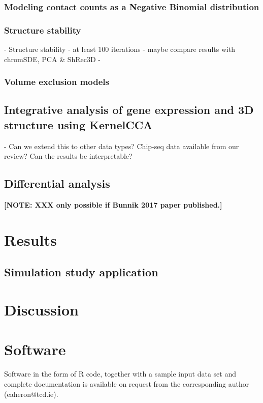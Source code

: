 \documentclass[oupdraft]{bio}
\newcommand{\note}[1]{\textbf{[NOTE: #1]}}
\begin{document}
\subsubsection{Modeling contact counts as a Negative Binomial distribution}


\subsubsection{Structure stability}
- Structure stability
- at least 100 iterations
- maybe compare results with chromSDE, PCA \& ShRec3D 
- 
\subsubsection{Volume exclusion models}

\subsection{Integrative analysis of gene expression and 3D structure using KernelCCA}

- Can we extend this to other data types? Chip-seq data available from our
review? Can the results be interpretable?

\subsection{Differential analysis}
\note{XXX only possible if Bunnik 2017 paper published.}

\section{Results}
\label{sec3}

\subsection{Simulation study application}

\section{Discussion}
\label{sec4}



\section{Software}
\label{sec5}

Software in the form of R code, together with a sample
input data set and complete documentation is available on
request from the corresponding author (eaheron@tcd.ie).
\end{document}
